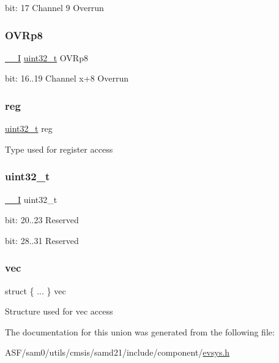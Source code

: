 bit\+: 17 Channel 9 Overrun \mbox{\label{union_e_v_s_y_s___i_n_t_f_l_a_g___type_af3ca2cc426588e6b085e0e5819bfb3be}} 
\subsubsection{\texorpdfstring{OVRp8}{OVRp8}}
{\footnotesize\ttfamily \mbox{\hyperlink{core__cm0plus_8h_af63697ed9952cc71e1225efe205f6cd3}{\+\_\+\+\_\+I}} \mbox{\hyperlink{union_e_v_s_y_s___i_n_t_f_l_a_g___type_a7c2ec0f7b3f1314bdede58b182af397c}{uint32\+\_\+t}} O\+V\+Rp8}

bit\+: 16..19 Channel x+8 Overrun \mbox{\label{union_e_v_s_y_s___i_n_t_f_l_a_g___type_a6b91636401516a477989a336376d7b40}} 
\subsubsection{\texorpdfstring{reg}{reg}}
{\footnotesize\ttfamily \mbox{\hyperlink{union_e_v_s_y_s___i_n_t_f_l_a_g___type_a7c2ec0f7b3f1314bdede58b182af397c}{uint32\+\_\+t}} reg}

Type used for register access \mbox{\label{union_e_v_s_y_s___i_n_t_f_l_a_g___type_a7c2ec0f7b3f1314bdede58b182af397c}} 
\subsubsection{\texorpdfstring{uint32\_t}{uint32\_t}}
{\footnotesize\ttfamily \mbox{\hyperlink{core__cm0plus_8h_af63697ed9952cc71e1225efe205f6cd3}{\+\_\+\+\_\+I}} uint32\+\_\+t}

bit\+: 20..23 Reserved

bit\+: 28..31 Reserved \mbox{\label{union_e_v_s_y_s___i_n_t_f_l_a_g___type_aaddab8b523cb6097d324f447505c6eb8}} 
\subsubsection{\texorpdfstring{vec}{vec}}
{\footnotesize\ttfamily struct \{ ... \}   vec}

Structure used for vec access 

The documentation for this union was generated from the following file\+:\begin{DoxyCompactItemize}
\item 
A\+S\+F/sam0/utils/cmsis/samd21/include/component/\mbox{\hyperlink{component_2evsys_8h}{evsys.\+h}}\end{DoxyCompactItemize}
